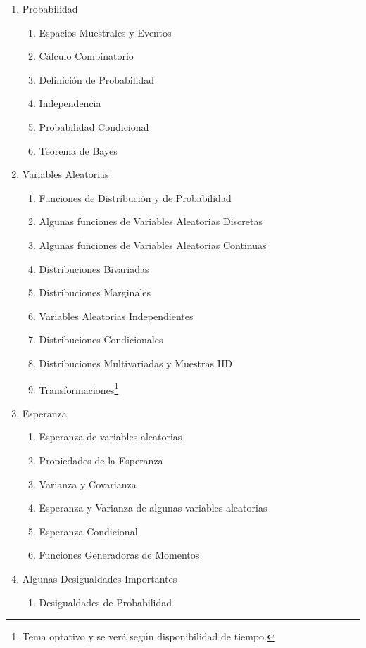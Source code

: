 \documentclass[letterpaper, 12pt]{article}
\begin{document}
\begin{enumerate}
\item Probabilidad
	\begin{enumerate}
    	\item Espacios Muestrales y Eventos
        \item Cálculo Combinatorio
        \item Definición de Probabilidad
        \item Independencia
        \item Probabilidad Condicional
        \item Teorema de Bayes
    \end{enumerate}
\item Variables Aleatorias
	\begin{enumerate}
    	\item Funciones de Distribución y de Probabilidad
        \item Algunas funciones de Variables Aleatorias Discretas
        \item Algunas funciones de Variables Aleatorias Continuas
        \item Distribuciones Bivariadas
        \item Distribuciones Marginales
        \item Variables Aleatorias Independientes
        \item Distribuciones Condicionales 
        \item Distribuciones Multivariadas y Muestras IID
        \item Transformaciones\footnote{Tema optativo y se verá según disponibilidad de tiempo.}
    \end{enumerate}
\item Esperanza
	\begin{enumerate}
    	\item Esperanza de variables aleatorias
        \item Propiedades de la Esperanza
        \item Varianza y Covarianza
        \item Esperanza y Varianza de algunas variables aleatorias
        \item Esperanza Condicional
        \item Funciones Generadoras de Momentos
    \end{enumerate}
\item Algunas Desigualdades Importantes
    \begin{enumerate}
        \item Desigualdades de Probabilidad

\end{enumerate}
\end{enumerate}
\end{document}
